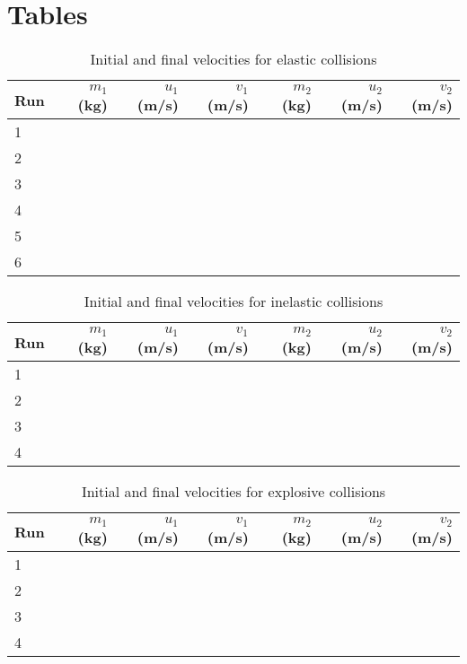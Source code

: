 \section{Tables}
\begin{table}[ht]
    \centering
    \begin{tabular}{|l|r|r|r|r|r|r|}
        \hline
        Run & $m_{1}$ (kg) & $u_{1}$ (m/s) & $v_{1}$ (m/s) & $m_{2}$ (kg) & $u_{2}$ (m/s) & $v_{2}$ (m/s) \\
        \hline
        1 & & & & & & \\
        2 & & & & & & \\
        3 & & & & & & \\
        4 & & & & & & \\
        5 & & & & & & \\
        6 & & & & & & \\
        \hline
    \end{tabular}
    \caption{Initial and final velocities for elastic collisions}
    \label{09:table.v.elastic}
\end{table}
\begin{table}[ht]
    \centering
    \begin{tabular}{|l|r|r|r|r|r|r|}
        \hline
        Run & $m_{1}$ (kg) & $u_{1}$ (m/s) & $v_{1}$ (m/s) & $m_{2}$ (kg) & $u_{2}$ (m/s) & $v_{2}$ (m/s) \\
        \hline
        1 & & & & & & \\
        2 & & & & & & \\
        3 & & & & & & \\
        4 & & & & & & \\
        \hline
    \end{tabular}
    \caption{Initial and final velocities for inelastic collisions}
    \label{09:table.v.inelastic}
\end{table}
\begin{table}[ht]
    \centering
    \begin{tabular}{|l|r|r|r|r|r|r|}
        \hline
        Run & $m_{1}$ (kg) & $u_{1}$ (m/s) & $v_{1}$ (m/s) & $m_{2}$ (kg) & $u_{2}$ (m/s) & $v_{2}$ (m/s) \\
        \hline
        1 & & & & & & \\
        2 & & & & & & \\
        3 & & & & & & \\
        4 & & & & & & \\
        \hline
    \end{tabular}
    \caption{Initial and final velocities for explosive collisions}
    \label{09:table.v.explosive}
\end{table}
